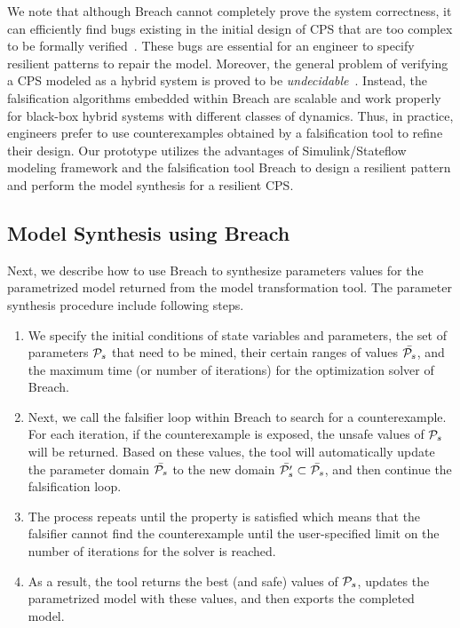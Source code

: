 We note that although Breach cannot completely prove the system correctness, it can efficiently find bugs existing in the initial design of CPS that are too complex to be formally verified~\cite{kapinski2015simulation}. These bugs are essential for an engineer to specify resilient patterns to repair the model. 
%
Moreover, the general problem of verifying a CPS modeled as a hybrid system is proved to be \emph{undecidable}~\cite{henzinger1995s}. 
%
Instead, the falsification algorithms embedded within Breach are scalable and work properly for black-box hybrid systems with different classes of dynamics.
%
Thus, in practice, engineers prefer to use counterexamples obtained by a falsification tool to refine their design. Our prototype \toolreaffirm utilizes the advantages of Simulink/Stateflow modeling framework and the falsification tool Breach to design a resilient pattern and perform the model synthesis for a resilient CPS.
%
\subsection{Model Synthesis using Breach}
Next, we describe how to use Breach to synthesize parameters values for the parametrized model returned from the model transformation tool. The parameter synthesis procedure include following steps.

\begin{enumerate}[leftmargin= 2 em]
\item We specify the initial conditions of state variables and parameters, the set of parameters $\P_s$ that need to be mined, their certain ranges of values $\bar{\P_s}$, and the maximum time (or number of iterations) for the optimization solver of Breach.
\item Next, we call the falsifier loop within Breach to search for a counterexample. For each iteration, if the counterexample is exposed, the unsafe values of $\P_s$ will be returned. Based on these values, the tool will automatically update the parameter domain $\bar{\P_s}$ to the new domain $\bar{\P'_s} \subset \bar{\P_s}$, and then continue the falsification loop.
\item The process repeats until the property is satisfied which means that the falsifier cannot find the counterexample until the user-specified limit on the number of iterations for the solver is reached. 
\item As a result, the tool returns the best (and safe) values of $\P_s$, updates the parametrized model with these values, and then exports the completed model.   
\end{enumerate}

